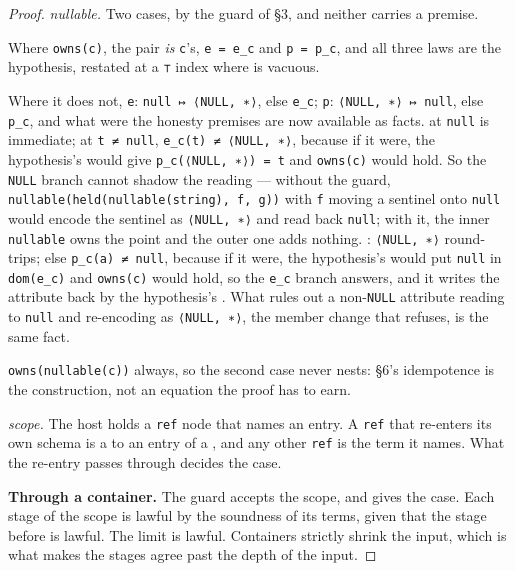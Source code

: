 \begin{proof}
\emph{nullable.} Two cases, by the guard of §3, and neither carries a premise.

Where \texttt{owns(c)}, the pair \emph{is} \texttt{c}'s, \texttt{e\ =\ e\_c} and \texttt{p\ =\ p\_c}, and all three laws are the
hypothesis, restated at a \texttt{⊤} index where  is vacuous.

Where it does not, \texttt{e}: \texttt{null\ ↦\ ⟨NULL,\ ∗⟩}, else \texttt{e\_c}; \texttt{p}: \texttt{⟨NULL,\ ∗⟩\ ↦\ null}, else \texttt{p\_c}, and
what were the honesty premises are now available as facts.  at \texttt{null} is immediate; at
\texttt{t\ ≠\ null}, \texttt{e\_c(t)\ ≠\ ⟨NULL,\ ∗⟩}, because if it were, the hypothesis's  would give
\texttt{p\_c(⟨NULL,\ ∗⟩)\ =\ t} and \texttt{owns(c)} would hold. So the \texttt{NULL} branch cannot shadow the reading —
without the guard, \texttt{nullable(held(nullable(string),\ f,\ g))} with \texttt{f} moving a sentinel onto \texttt{null}
would encode the sentinel as \texttt{⟨NULL,\ ∗⟩} and read back \texttt{null}; with it, the inner \texttt{nullable} owns
the point and the outer one adds nothing. : \texttt{⟨NULL,\ ∗⟩} round-trips; else \texttt{p\_c(a)\ ≠\ null},
because if it were, the hypothesis's  would put \texttt{null} in \texttt{dom(e\_c)} and \texttt{owns(c)} would
hold, so the \texttt{e\_c} branch answers, and it writes the attribute back by the hypothesis's
. What rules out a non-\texttt{NULL} attribute reading to \texttt{null} and re-encoding as
\texttt{⟨NULL,\ ∗⟩}, the member change that  refuses, is the same fact.

\texttt{owns(nullable(c))} always, so the second case never nests: §6's idempotence is the construction,
not an equation the proof has to earn.

\emph{scope.} The host holds a \texttt{ref} node that names an entry. A \texttt{ref} that re-enters its own schema is a  to an entry
of a , and any other \texttt{ref} is the term it names. What the re-entry passes through
decides the case.

\textbf{Through a container.} The guard accepts the scope, and  gives the
case. Each stage of the scope is lawful by the soundness of its terms, given that the stage before is
lawful. The limit is lawful. Containers strictly shrink the input, which is what makes the stages
agree past the depth of the input.


\end{proof}
